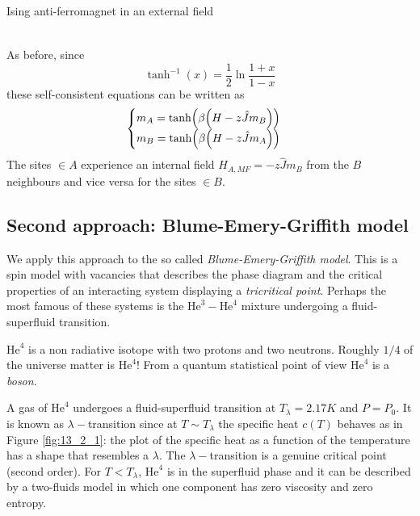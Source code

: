 \documentclass[../main/main.tex]{subfiles}
\begin{document}
\begin{example}{Ising anti-ferromagnet in an external field}{}
\begin{itemize}
\begin{subequations*}
\begin{align*}
\end{align*}
\end{subequations*}
As before, since
\begin{equation*}
  \tanh^{-1} (x) = \frac{1}{2} \ln{\frac{1+x}{1-x}}
\end{equation*}
these self-consistent equations can be written as
\begin{equation}
  \begin{cases}
   m_A = \tanh ( \beta \qty(H - z \hat{J} m_B ) )\\
   m_B = \tanh ( \beta \qty(H - z \hat{J} m_A ) )
  \end{cases}
\end{equation}
The sites \( \in A \) experience an internal field \( H_{A,MF} = - z \hat{J} m_B \) from the \( B \) neighbours and vice versa for the sites \( \in B \).
\end{itemize}
\end{example}

\subsection{Second approach: Blume-Emery-Griffith model}
We apply this approach to the so called \emph{Blume-Emery-Griffith model}.
This is a spin model with vacancies that describes the phase diagram and the critical properties of an interacting system displaying a \emph{tricritical point}. Perhaps the most famous of these systems is the \( \text{He}^3-\text{He}^4 \) mixture undergoing a fluid-superfluid transition.

\begin{remark}
\( \text{He}^4 \)  is a non radiative isotope with two protons and two neutrons. Roughly \( 1/4 \) of the universe matter is \( \text{He}^4 \)!
From a quantum statistical point of view \( \text{He}^4 \) is a \emph{boson}.
\end{remark}

 A gas of \( \text{He}^4 \) undergoes a fluid-superfluid transition at \( T_ \lambda =2.17 K \) and \( P=P_0 \). It is known as \( \lambda - \)transition since at \( T \sim T_ \lambda  \)  the specific heat \( c(T) \) behaves as in Figure \ref{fig:13_2_1}: the plot of the specific heat as a function of the temperature has a shape that resembles a \(\lambda\). 
The \( \lambda - \)transition is a genuine critical point (second order). For \( T < T_{\lambda } \), \( \text{He}^4 \)  is in the superfluid phase and it can be described by a two-fluids model in which one component has zero viscosity and zero entropy.
\end{document}
